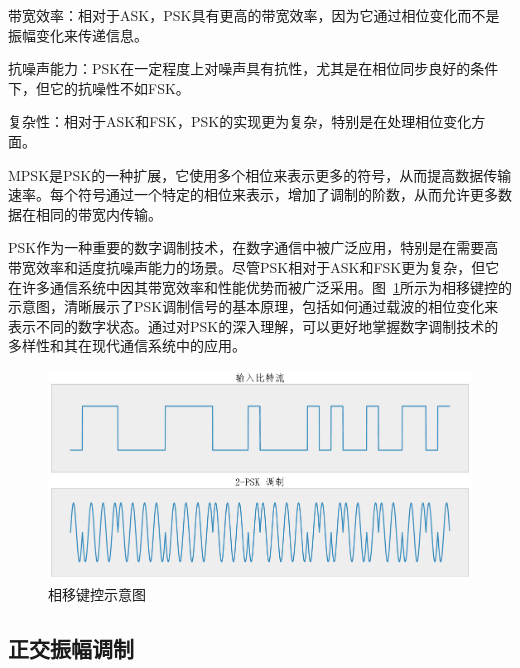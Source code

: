 带宽效率：相对于ASK，PSK具有更高的带宽效率，因为它通过相位变化而不是振幅变化来传递信息。

抗噪声能力：PSK在一定程度上对噪声具有抗性，尤其是在相位同步良好的条件下，但它的抗噪性不如FSK。

复杂性：相对于ASK和FSK，PSK的实现更为复杂，特别是在处理相位变化方面。

MPSK是PSK的一种扩展，它使用多个相位来表示更多的符号，从而提高数据传输速率。每个符号通过一个特定的相位来表示，增加了调制的阶数，从而允许更多数据在相同的带宽内传输。

PSK作为一种重要的数字调制技术，在数字通信中被广泛应用，特别是在需要高带宽效率和适度抗噪声能力的场景。尽管PSK相对于ASK和FSK更为复杂，但它在许多通信系统中因其带宽效率和性能优势而被广泛采用。图~\ref{fig:PSK}所示为相移键控的示意图，清晰展示了PSK调制信号的基本原理，包括如何通过载波的相位变化来表示不同的数字状态。通过对PSK的深入理解，可以更好地掌握数字调制技术的多样性和其在现代通信系统中的应用。

\begin{figure}[htbp]
    \centering
    \includegraphics[width=\textwidth]{Image/psk.pdf}
    \caption{相移键控示意图}
    \label{fig:PSK}
\end{figure}


\subsection{正交振幅调制}\label{sec:background}

